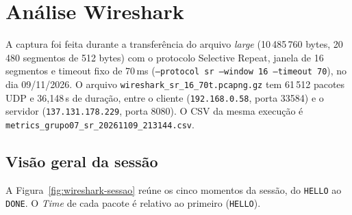 \section{Análise Wireshark}

A captura foi feita durante a transferência do arquivo \textit{large}
(10\,485\,760 bytes, 20\,480 segmentos de 512 bytes) com o protocolo
Selective Repeat, janela de 16 segmentos e timeout fixo de 70\,ms
(\texttt{--protocol sr --window 16 --timeout 70}), no dia 09/11/2026. O arquivo
\texttt{wireshark\_sr\_16\_70t.pcapng.gz} tem 61\,512 pacotes UDP e
36,148\,s de duração, entre o cliente (\texttt{192.168.0.58}, porta 33584) e o
servidor (\texttt{137.131.178.229}, porta 8080). O CSV da mesma execução é
\texttt{metrics\_grupo07\_sr\_20261109\_213144.csv}.
\subsection{Visão geral da sessão}

A Figura~\ref{fig:wireshark-sessao} reúne os cinco momentos da sessão, do
\texttt{HELLO} ao \texttt{DONE}. O \textit{Time} de cada pacote é relativo ao
primeiro (\texttt{HELLO}).


